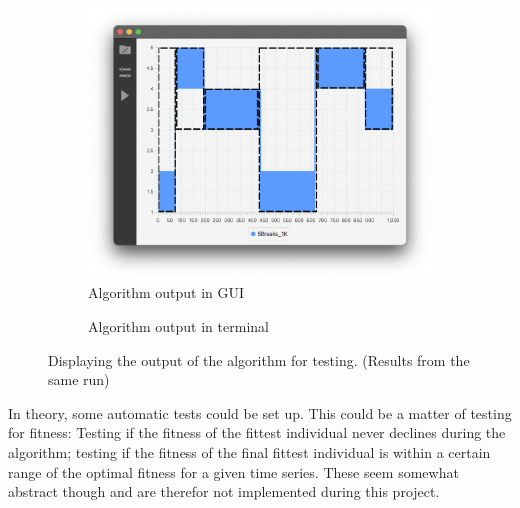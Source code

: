 \begin{figure}[ht]
    \centering
    \begin{subfigure}[b]{.48\textwidth}
        \centering
        \includegraphics[width=\textwidth]{fig/bp-locations-gui.png}
        \caption{Algorithm output in GUI}
        \label{fig:bp-locations-gui}
    \end{subfigure}
    \hfill
    \begin{subfigure}[b]{.48\textwidth}
        \centering
        \caption{Algorithm output in terminal}
        \label{fig:bp-locations-term}
    \end{subfigure}
    \caption{Displaying the output of the algorithm for testing. (Results from the same run)}
    \label{fig:bp-locations}
\end{figure}

In theory, some automatic tests could be set up. This could be a matter of
testing for fitness: Testing if the fitness of the fittest individual never
declines during the algorithm; testing if the fitness of the final fittest
individual is within a certain range of the optimal fitness for a given time
series. These seem somewhat abstract though and are therefor not implemented
during this project. 